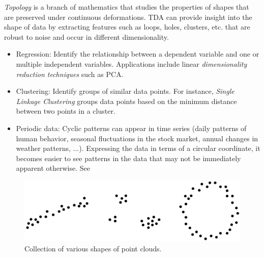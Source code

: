 \documentclass[11pt, a4paper]{amsart}
\begin{document}
\emph{Topology} is a branch of mathematics that studies the properties of shapes that are preserved under continuous deformations.
TDA can provide insight into the shape of data by extracting features such as loops, holes, clusters, etc. that are robust to noise and occur in different dimensionality.

\begin{itemize}
	\item Regression:
	Identify the relationship between a dependent variable and one or multiple independent variables.
	Applications include linear \emph{dimensionality reduction techniques} such as PCA.
	\item Clustering:
	Identify groups of similar data points.
	For instance, \emph{Single Linkage Clustering} groups data points based on the minimum distance between two points in a cluster.
	\item Periodic data:
	Cyclic patterns can appear in time series (daily patterns of human behavior, seasonal fluctuations in the stock market, annual changes in weather patterns, ...).
	Expressing the data in terms of a circular coordinate, it becomes easier to see patterns in the data that may not be immediately apparent otherwise.
	See 
\end{itemize}

\begin{figure}
	\centering
	\includegraphics[width=0.8\linewidth]{figures/topological_data_analysis/topological_data_analysis_collection}
	\caption{
		Collection of various shapes of point clouds.
		\label{fig:topological_data_analysis_collection}
	}
\end{figure}
\end{document}
